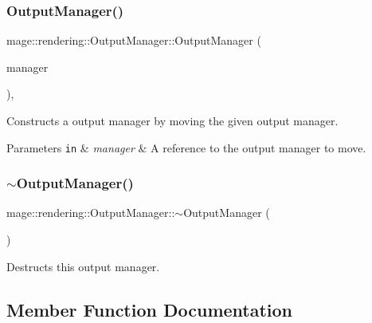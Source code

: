 \subsubsection{\texorpdfstring{Output\+Manager()}{OutputManager()}\hspace{0.1cm}{\footnotesize\ttfamily [3/3]}}
{\footnotesize\ttfamily mage\+::rendering\+::\+Output\+Manager\+::\+Output\+Manager (\begin{DoxyParamCaption}\item[{\hyperlink{classmage_1_1rendering_1_1_output_manager}{Output\+Manager} \&\&}]{manager }\end{DoxyParamCaption})\hspace{0.3cm}{\ttfamily [default]}, {\ttfamily [noexcept]}}

Constructs a output manager by moving the given output manager.


\begin{DoxyParams}[1]{Parameters}
\mbox{\tt in}  & {\em manager} & A reference to the output manager to move. \\
\hline
\end{DoxyParams}
\hypertarget{classmage_1_1rendering_1_1_output_manager_ad2a02128a123be93391c8058ef2b3a0b}{}\label{classmage_1_1rendering_1_1_output_manager_ad2a02128a123be93391c8058ef2b3a0b} 
\subsubsection{\texorpdfstring{$\sim$\+Output\+Manager()}{~OutputManager()}}
{\footnotesize\ttfamily mage\+::rendering\+::\+Output\+Manager\+::$\sim$\+Output\+Manager (\begin{DoxyParamCaption}{ }\end{DoxyParamCaption})\hspace{0.3cm}{\ttfamily [default]}}

Destructs this output manager. 

\subsection{Member Function Documentation}
\hypertarget{classmage_1_1rendering_1_1_output_manager_a9c753354655b7b218263832c343417d1}{}\label{classmage_1_1rendering_1_1_output_manager_a9c753354655b7b218263832c343417d1} 
